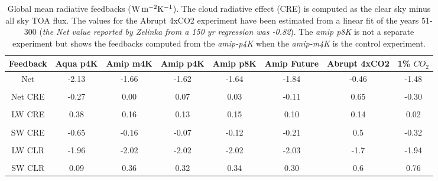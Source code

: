 \documentclass[draft]{agujournal2019}
\begin{document}
\begin{table}
\begin{center}
\caption{Global mean radiative feedbacks ($\rm{W\, m^{-2} K^{-1}}$).  The cloud radiative effect (CRE) is computed as
 the clear sky minus all sky TOA flux. The values for the Abrupt 4xCO2 experiment
have been estimated from a linear fit of the years 51-300 (\textit{the Net value reported by Zelinka from a 150 yr regression was -0.82}).  The \textit{amip p8K} is not a separate experiment but
shows the feedbacks computed from the \textit{amip-p4K} when the \textit{amip-m4K} is the control experiment.}
    \begin{tabular}{*{8}{c}}
    \hline
    \hline
 Feedback & Aqua p4K & Amip m4K & Amip p4K &  Amip p8K & Amip Future & Abrupt 4xCO2  & 1\% $CO_2$  \\ \hline
    Net          &   -2.13      &  -1.66          &  -1.62         & -1.64           & -1.84        &    -0.46   & -1.48      \\ 
    \\
    Net CRE   & -0.27       &  0.00              & 0.07         & 0.03         & -0.11          & 0.65   & -0.30  \\  
    \\
    LW CRE   & 0.38        &  0.16              & 0.13           & 0.15        & 0.10          & 0.14  & 0.02    \\  
    \\
    SW CRE  & -0.65     &  -0.16              & -0.07          & -0.12        & -0.21         & 0.5  & -0.32       \\  
    \\
    LW CLR   & -1.96       &  -2.02            & -2.02           & -2.02       & -2.03         & -1.7   & -1.94      \\  
    \\
    SW CLR  & 0.09        & 0.36              & 0.32             & 0.34        & 0.30          & 0.6    & 0.76        \\  \hline

    \end{tabular}\par
    \label{tab:lambda}
\end{center}
\end{table}
    
\end{document}
